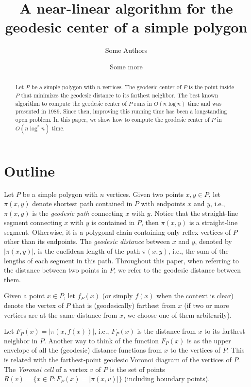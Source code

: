 \documentclass[a4paper,UKenglish]{lipics}
\title{A near-linear algorithm for the geodesic center of a simple polygon}
\author[1]{Some Authors}
\author[2]{Some more}
\affil[1]{Dummy University Computing Laboratory\\
  Address, Country\\
  \texttt{open@dummyuni.org}}
\affil[2]{Department of Informatics, Dummy College\\
  Address, Country\\
  \texttt{access@dummycollege.org}}
\newcommand{\F}[2]{\ensuremath{F_{\scriptscriptstyle #1}(#2)}}
\newcommand{\f}[2]{\ensuremath{f_{\scriptscriptstyle #1}(#2)}}
\newcommand{\ff}[1]{\ensuremath{f(#1)}}
\newcommand{\g}[2]{\ensuremath{|\pi(#1, #2)|}}
\newcommand{\p}[2]{\ensuremath{\pi(#1, #2)}}
\begin{document}
\maketitle

\begin{abstract}
Let $P$ be a simple polygon with $n$ vertices. 
The geodesic center of $P$ is the point inside $P$ that minimizes the geodesic distance to its farthest neighbor. 
The best known algorithm to compute the geodesic center of $P$ runs in $O(n \log n)$ time and was presented in 1989. 
Since then, improving this running time has been a longstanding open problem.
In this paper, we show how to compute the geodesic center of $P$ in $O(n\log ^* n)$ time.
\end{abstract}



\section{Outline}

Let $P$ be a simple polygon with $n$ vertices. 
Given two points $x,y\in P$, let $\p{x}{y}$ denote shortest path contained in $P$ with endpoints $x$ and $y$, i.e., $\p{x}{y}$ is the \emph{geodesic path} connecting $x$ with $y$. Notice that the straight-line segment connecting $x$ with $y$ is contained in $P$, then $\p{x}{y}$ is a straight-line segment. Otherwise, it is a polygonal chain containing only reflex vertices of $P$ other than its endpoints.
The \emph{geodesic distance} between $x$ and $y$, denoted by $\g{x}{y}$, is the euclidean length of the path $\p{x}{y}$, i.e., the sum of the lengths of each segment in this path.
Throughout this paper, when referring to the distance between two points in $P$, we refer to the geodesic distance between them.

Given a point $x\in P$, let $\f{P}{x}$ (or simply $\ff{x}$ when the context is clear) denote the vertex of $P$ that is (geodesically) farthest from $x$ (if two or more vertices are at the same distance from $x$, we choose one of them arbitrarily). 


Let $\F{P}{x} = \g{x}{\ff{x}}$, i.e., $\F{P}{x}$ is the distance from $x$ to its farthest neighbor in $P$. 
Another way to think of the function $\F{P}{x}$ is as the upper envelope of all the (geodesic) distance functions from $x$ to the vertices of $P$. This is related with the farthest-point geodesic Voronoi diagram of the vertices of $P$. The \emph{Voronoi cell} of a vertex $v$ of $P$ is the set of points $R(v) = \{x\in P : \F{P}{x} = \g{x}{v}\}$ (including boundary points).
\end{document}
